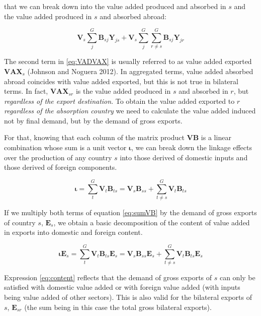that we can break down into the value added produced and absorbed in \(s\) and the
value added produced in \(s\) and absorbed abroad:

\begin{equation}
  \mathbf{V}_s \sum_{j}^{G}{\mathbf{B}_{sj}\mathbf{Y}_{js}} +
    \mathbf{V}_s \sum_{j}^{G} \sum_{r\neq s}^{G} {\mathbf{B}_{sj}\mathbf{Y}_{jr}}
    \label{eq:VADVAX}
\end{equation}

The second term in \eqref{eq:VADVAX} is usually referred to as value added
exported \({\mathbf{VAX}}_s\) (Johnson and Noguera 2012). In aggregated terms,
value added absorbed abroad coincides with value added exported, but this is not
true in bilateral terms. In fact, \({\mathbf{VAX}}_{sr}\) is the value added
produced in \(s\) and absorbed in \(r\), but \emph{regardless of the export destination}.
To obtain the value added exported to \(r\) \emph{regardless of the absorption country}
we need to calculate the value added induced not by final demand, but by the
demand of gross exports.

For that, knowing that each column of the matrix product
\(\mathbf{V} \mathbf{B}\) is a linear combination whose sum is a unit vector
\(\boldsymbol{\iota}\), we can break down the linkage effects over the production
of any country \(s\) into those derived of domestic inputs and those derived of
foreign components.

\begin{equation}
    \boldsymbol{\iota} = \sum_{t}^{G}{{\mathbf{V}}_t\mathbf{B}_{ts}} =
    {\mathbf{V}}_s \mathbf{B}_{ss} + \sum_{t\neq s}^{G}
    {{\mathbf{V}}_t\mathbf{B}_{ts}}
     \label{eq:sumVB}
\end{equation}

If we multiply both terms of equation \eqref{eq:sumVB} by the demand of gross
exports of country \(s\), \(\mathbf{E}_s\), we obtain a basic decomposition of the
content of value added in exports into domestic and foreign content.

\begin{equation} 
    \boldsymbol{\iota} \mathbf{E}_{s}
    = \sum_{t}^{G} {{\mathbf{V}}_t\mathbf{B}_{ts}\mathbf{E}_{s}}
    = {\mathbf{V}}_s \mathbf{B}_{ss} \mathbf{E}_{s} +
    \sum_{t\neq s}^{G}{{\mathbf{V}}_t \mathbf{B}_{ts} \mathbf{E}_{s}}
    \label{eq:content}
\end{equation}

Expression \eqref{eq:content} reflects that the demand of gross exports of \(s\)
can only be satisfied with domestic value added or with foreign value added
(with inputs being value added of other sectors). This is also valid for the
bilateral exports of \(s\), \(\mathbf{E}_{sr}\) (the sum being in this case the
total gross bilateral exports).

